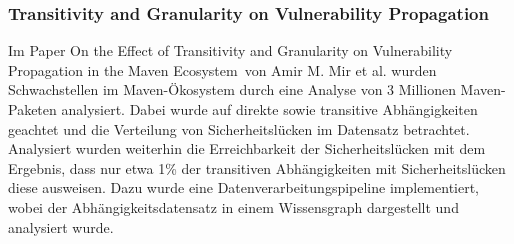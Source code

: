 \subsubsection{Transitivity and Granularity on Vulnerability Propagation} \label{sec:Transitivity}
    Im Paper \glqq On the Effect of Transitivity and Granularity on Vulnerability Propagation in the Maven Ecosystem\grqq~von Amir M. Mir et al. wurden Schwachstellen im Maven-Ökosystem durch eine Analyse von 3 Millionen Maven-Paketen analysiert. %
    Dabei wurde auf direkte sowie transitive Abhängigkeiten geachtet und die Verteilung von Sicherheitslücken im Datensatz betrachtet.
    Analysiert wurden weiterhin die Erreichbarkeit der Sicherheitslücken mit dem Ergebnis, dass nur etwa 1\% der transitiven Abhängigkeiten mit Sicher\-heits\-lücken diese ausweisen.
    Dazu wurde eine Datenverarbeitungspipeline implementiert, wobei der Abhängigkeitsdatensatz in einem Wissensgraph dargestellt und analysiert wurde.